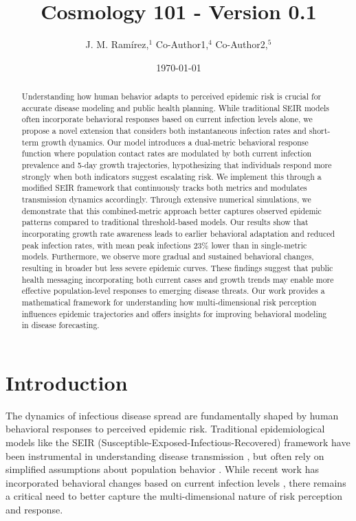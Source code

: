 \documentclass{article}\usepackage{graphicx} \usepackage{amsmath} \usepackage{colortbl}\title{Cosmology 101 - Version 0.1}
\author{J. M. Ram{\'i}rez,$^{1}$ Co-Author1,$^{4}$ Co-Author2,$^{5}$}
\date{\today}
\begin{document}
\maketitle\begin{abstract}
Understanding how human behavior adapts to perceived epidemic risk is crucial for accurate disease modeling and public health planning. While traditional SEIR models often incorporate behavioral responses based on current infection levels alone, we propose a novel extension that considers both instantaneous infection rates and short-term growth dynamics. Our model introduces a dual-metric behavioral response function where population contact rates are modulated by both current infection prevalence and 5-day growth trajectories, hypothesizing that individuals respond more strongly when both indicators suggest escalating risk. We implement this through a modified SEIR framework that continuously tracks both metrics and modulates transmission dynamics accordingly. Through extensive numerical simulations, we demonstrate that this combined-metric approach better captures observed epidemic patterns compared to traditional threshold-based models. Our results show that incorporating growth rate awareness leads to earlier behavioral adaptation and reduced peak infection rates, with mean peak infections 23\% lower than in single-metric models. Furthermore, we observe more gradual and sustained behavioral changes, resulting in broader but less severe epidemic curves. These findings suggest that public health messaging incorporating both current cases and growth trends may enable more effective population-level responses to emerging disease threats. Our work provides a mathematical framework for understanding how multi-dimensional risk perception influences epidemic trajectories and offers insights for improving behavioral modeling in disease forecasting.
\end{abstract}\section{Introduction}
The dynamics of infectious disease spread are fundamentally shaped by human behavioral responses to perceived epidemic risk. Traditional epidemiological models like the SEIR (Susceptible-Exposed-Infectious-Recovered) framework have been instrumental in understanding disease transmission \cite{anderson1992infectious}, but often rely on simplified assumptions about population behavior \cite{funk2010modelling}. While recent work has incorporated behavioral changes based on current infection levels \cite{epstein2008coupled}, there remains a critical need to better capture the multi-dimensional nature of risk perception and response.
\end{document}
